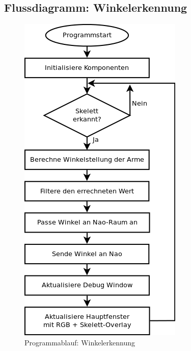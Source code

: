 \subsection{Flussdiagramm: Winkelerkennung}
	\begin{figure}[H]						
		\centering							
		\includegraphics[scale=0.8]{Bilder/Flussdiagramm.png}			
		\caption{Programmablauf: Winkelerkennung}						
		\label{f:pap}						
	\end{figure}
